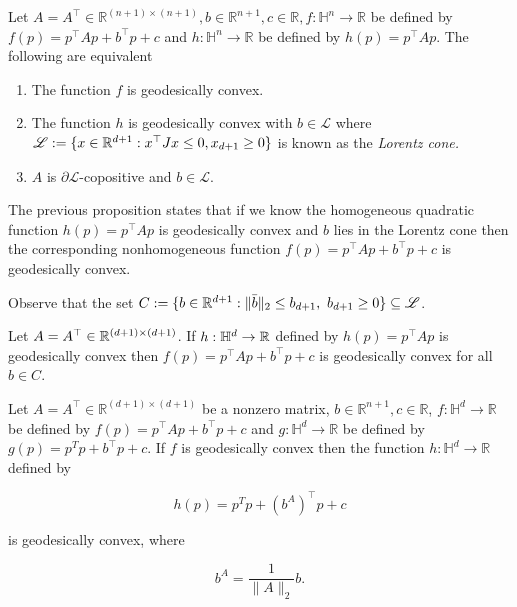 \documentclass[twoside,11pt]{article}
\begin{document}
\begin{prop}\label{prop:nonhom_hom}
    Let $A=A^{\top} \in \mathbb{R}^{(n+1) \times(n+1)}, b \in \mathbb{R}^{n+1}, c \in \mathbb{R}, f: \mathbb{H}^n \rightarrow \mathbb{R}$ be defined by $f(p)=p^{\top} A p+b^{\top} p+c$ and $h: \mathbb{H}^n \rightarrow \mathbb{R}$ be defined by $h(p)=p^{\top} A p$. The following are equivalent
    \begin{enumerate}
        \item \text The function $f$ is geodesically convex.
        \item The function $h$ is geodesically convex with $b \in \mathscr{L}$ where $\mathscr{L} := \{x \in \mathbb{R}^{d+1}: x^\top J x \leq 0, x_{d+1} \geq 0\}$ is known as the \emph{Lorentz cone.}
        \item  $A$ is $\partial \mathscr{L}$-copositive and $b \in \mathscr{L}$.
    \end{enumerate}
\end{prop}

The previous proposition states that if we know the homogeneous quadratic function $h(p) = p^\top A p$ is geodesically convex and $b$ lies in the Lorentz cone then the corresponding nonhomogeneous function $f(p) = p^\top A p + b^\top p + c$ is geodesically convex.


\begin{example}\label{ex:lorentz_cone_set}
    Observe that the set $C := \{b \in \mathbb{R}^{d+1} : \|\bar{b}\|_2 \leq b_{d+1}, \ b_{d+1} \geq 0\} \subseteq \mathscr{L}$. 
    
    Let $A = A^\top \in \mathbb{R}^{(d+1) \times (d+1)}$.  If $h:\mathbb{H}^d \to \mathbb{R}$ defined by $h(p) = p^\top A p$ is geodesically convex then $f(p) = p^\top A p + b^\top p + c$ is geodesically convex for all $b \in C$.
\end{example}


\begin{prop}
Let $A=A^{\top} \in \mathbb{R}^{(d+1) \times(d+1)}$ be a nonzero matrix, $b \in \mathbb{R}^{n+1}, c \in \mathbb{R}$, $f: \mathbb{H}^d \rightarrow \mathbb{R}$ be defined by $f(p)=p^{\top} A p+b^{\top} p+c$ and $g: \mathbb{H}^d \rightarrow \mathbb{R}$ be defined by $g(p)=p^T p+b^{\top} p+c$. If $f$ is geodesically convex then the function $h: \mathbb{H}^d \rightarrow \mathbb{R}$ defined by

$$
h(p)=p^T p+\left(b^A\right)^{\top} p+c
$$

is geodesically convex, where

$$
b^A=\frac{1}{\|A\|_2} b .
$$

\end{prop}
\end{document}
